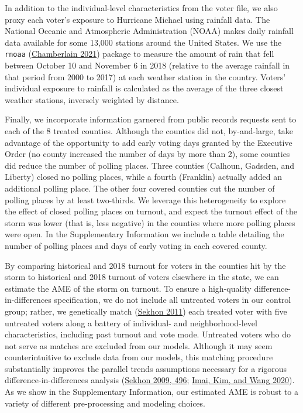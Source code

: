 \documentclass[
  12pt,
]{article}
\begin{document}
In addition to the individual-level characteristics from the voter file, we also proxy each voter's exposure to Hurricane Michael using rainfall data. The National Oceanic and Atmospheric Administration (NOAA) makes daily rainfall data available for some 13,000 stations around the United States. We use the \texttt{rnoaa} (\protect\hyperlink{ref-Chamberlain2021}{Chamberlain 2021}) package to measure the amount of rain that fell between October 10 and November 6 in 2018 (relative to the average rainfall in that period from 2000 to 2017) at each weather station in the country. Voters' individual exposure to rainfall is calculated as the average of the three closest weather stations, inversely weighted by distance.

Finally, we incorporate information garnered from public records requests sent to each of the 8 treated counties. Although the counties did not, by-and-large, take advantage of the opportunity to add early voting days granted by the Executive Order (no county increased the number of days by more than 2), some counties did reduce the number of polling places. Three counties (Calhoun, Gadsden, and Liberty) closed no polling places, while a fourth (Franklin) actually added an additional polling place. The other four covered counties cut the number of polling places by at least two-thirds. We leverage this heterogeneity to explore the effect of closed polling places on turnout, and expect the turnout effect of the storm was lower (that is, less negative) in the counties where more polling places were open. In the Supplementary Information we include a table detailing the number of polling places and days of early voting in each covered county.

By comparing historical and 2018 turnout for voters in the counties hit by the storm to historical and 2018 turnout of voters elsewhere in the state, we can estimate the AME of the storm on turnout. To ensure a high-quality difference-in-differences specification, we do not include all untreated voters in our control group; rather, we genetically match (\protect\hyperlink{ref-Sekhon2011}{Sekhon 2011}) each treated voter with five untreated voters along a battery of individual- and neighborhood-level characteristics, including past turnout and vote mode. Untreated voters who do not serve as matches are excluded from our models. Although it may seem counterintuitive to exclude data from our models, this matching procedure substantially improves the parallel trends assumptions necessary for a rigorous difference-in-differences analysis (\protect\hyperlink{ref-Sekhon2009}{Sekhon 2009, 496}; \protect\hyperlink{ref-Imai2020}{Imai, Kim, and Wang 2020}). As we show in the Supplementary Information, our estimated AME is robust to a variety of different pre-processing and modeling choices.
\end{document}
